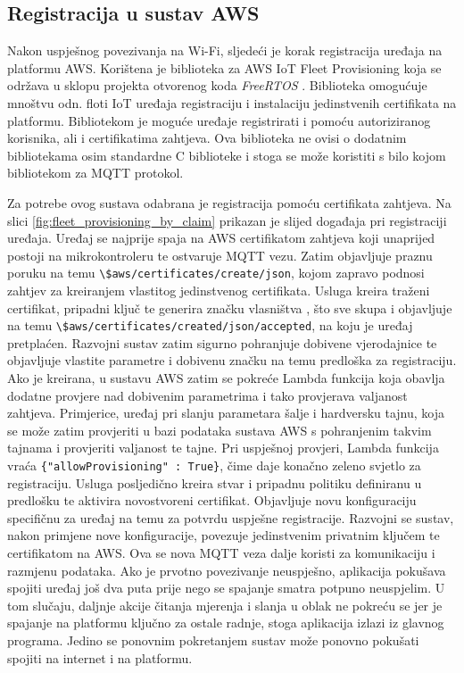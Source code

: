 \subsection{Registracija u sustav AWS}

Nakon uspješnog povezivanja na Wi-Fi, sljedeći je korak registracija uređaja na platformu AWS. Korištena je biblioteka za AWS IoT Fleet Provisioning koja se održava u sklopu projekta otvorenog koda \textit{FreeRTOS} \cite{fleet_prov_sdk}. Biblioteka omogućuje mnoštvu odn. floti IoT uređaja registraciju i instalaciju jedinstvenih certifikata na platformu. Bibliotekom je moguće uređaje registrirati i pomoću autoriziranog korisnika, ali i certifikatima zahtjeva. Ova biblioteka ne ovisi o dodatnim bibliotekama osim standardne C biblioteke i stoga se može koristiti s bilo kojom bibliotekom za MQTT protokol.

Za potrebe ovog sustava odabrana je registracija pomoću certifikata zahtjeva. Na slici \ref{fig:fleet_provisioning_by_claim} prikazan je slijed događaja pri registraciji uređaja. Uređaj se najprije spaja na AWS certifikatom zahtjeva koji unaprijed postoji na mikrokontroleru te ostvaruje MQTT vezu. Zatim objavljuje praznu poruku na temu \lstinline|\$aws/certificates/create/json|, kojom zapravo podnosi zahtjev za kreiranjem vlastitog jedinstvenog certifikata. Usluga kreira traženi certifikat, pripadni ključ te generira značku vlasništva , što sve skupa i objavljuje na temu \lstinline|\$aws/certificates/created/json/accepted|, na koju je uređaj pretplaćen. Razvojni sustav zatim sigurno pohranjuje dobivene vjerodajnice te objavljuje vlastite parametre i dobivenu značku na temu predloška za registraciju. Ako je kreirana, u sustavu AWS zatim se pokreće Lambda funkcija koja obavlja dodatne provjere nad dobivenim parametrima i tako provjerava valjanost zahtjeva. Primjerice, uređaj pri slanju parametara šalje i hardversku tajnu, koja se može zatim provjeriti u bazi podataka sustava AWS s pohranjenim takvim tajnama i provjeriti valjanost te tajne. Pri uspješnoj provjeri, Lambda funkcija vraća \lstinline|{"allowProvisioning" : True}|, čime daje konačno zeleno svjetlo za registraciju. Usluga posljedično kreira stvar i pripadnu politiku definiranu u predlošku te aktivira novostvoreni certifikat. Objavljuje novu konfiguraciju specifičnu za uređaj na temu za potvrdu uspješne registracije. Razvojni se sustav, nakon primjene nove konfiguracije, povezuje jedinstvenim privatnim ključem te certifikatom na AWS. Ova se nova MQTT veza dalje koristi za komunikaciju i razmjenu podataka. Ako je prvotno povezivanje neuspješno, aplikacija pokušava spojiti uređaj još dva puta prije nego se spajanje smatra potpuno neuspjelim. U tom slučaju, daljnje akcije čitanja mjerenja i slanja u oblak ne pokreću se jer je spajanje na platformu ključno za ostale radnje, stoga aplikacija izlazi iz glavnog programa. Jedino se ponovnim pokretanjem sustav može ponovno pokušati spojiti na internet i na platformu. 

